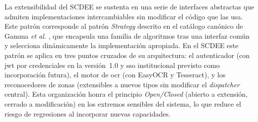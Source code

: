La extensibilidad del SCDEE se sustenta en una serie de interfaces
abstractas que admiten implementaciones intercambiables sin modificar el
código que las usa. Este patrón corresponde al patrón \textit{Strategy}
descrito en el catálogo canónico de Gamma \emph{et al.}
\cite{gof1994designpatterns}, que encapsula una familia de algoritmos
tras una interfaz común y selecciona dinámicamente la implementación
apropiada. En el SCDEE este patrón se aplica en tres puntos cruzados de
su arquitectura: el autenticador (con  \acs{jwt} por
credenciales en la versión~1.0 y \acs{sso} institucional previsto como
incorporación futura), el motor de \acs{ocr} (con  EasyOCR
y Tesseract), y los reconocedores de zonas (extensibles a nuevos tipos
sin modificar el \textit{dispatcher} central). Esta organización honra
el principio \emph{Open/Closed} (abierto a extensión, cerrado a
modificación) en los extremos sensibles del sistema, lo que reduce el
riesgo de regresiones al incorporar nuevas capacidades.
